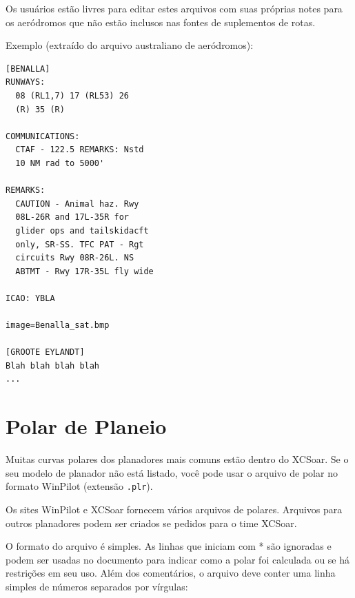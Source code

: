 Os usuários estão livres para editar estes arquivos com suas próprias notes para os aeródromos que não estão inclusos nas fontes de suplementos de rotas.

Exemplo (extraído do arquivo australiano de aeródromos):

\begin{verbatim}
[BENALLA]
RUNWAYS:
  08 (RL1,7) 17 (RL53) 26
  (R) 35 (R)

COMMUNICATIONS:
  CTAF - 122.5 REMARKS: Nstd
  10 NM rad to 5000'

REMARKS:
  CAUTION - Animal haz. Rwy
  08L-26R and 17L-35R for
  glider ops and tailskidacft
  only, SR-SS. TFC PAT - Rgt
  circuits Rwy 08R-26L. NS
  ABTMT - Rwy 17R-35L fly wide

ICAO: YBLA

image=Benalla_sat.bmp

[GROOTE EYLANDT]
Blah blah blah blah
...
\end{verbatim}

\section{Polar de Planeio} \label{sec:glide-polar}

Muitas curvas polares dos planadores mais comuns estão dentro do XCSoar.  Se o seu modelo de planador não está listado, você pode usar o arquivo de polar no formato WinPilot (extensão  \verb|.plr|).

Os sites WinPilot e XCSoar fornecem vários arquivos de polares.  Arquivos para outros planadores podem ser criados se pedidos para o time XCSoar.

O formato do arquivo é simples.  As linhas que iniciam com * são ignoradas e podem ser usadas no documento para indicar como a polar foi calculada ou se há restrições em seu uso.  Além dos comentários, o arquivo deve conter uma linha simples de números separados por vírgulas:

